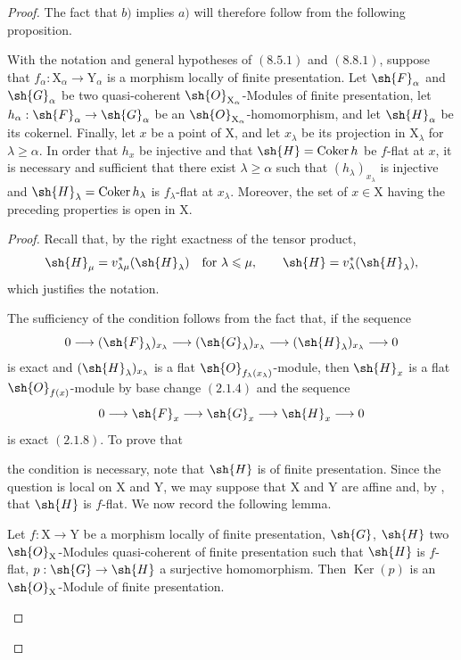 \begin{proof}
The fact that $b)$ implies $a)$ will therefore follow from the following proposition.

\begin{proposition}[11.3.9]
\label{IV.11.3.9}
With the notation and general hypotheses of $(8.5.1)$ and $(8.8.1)$, suppose that $f_\alpha:\mathrm{X}_\alpha\to\mathrm{Y}_\alpha$ is a morphism locally of finite presentation. Let $\sh{F}_\alpha$ and $\sh{G}_\alpha$ be two quasi-coherent $\sh{O}_{\mathrm{X}_\alpha}$-Modules of finite presentation, let $h_\alpha:\sh{F}_\alpha\to\sh{G}_\alpha$ be an $\sh{O}_{\mathrm{X}_\alpha}$-homomorphism, and let $\sh{H}_\alpha$ be its cokernel. Finally, let $x$ be a point of $\mathrm{X}$, and let $x_\lambda$ be its projection in $\mathrm{X}_\lambda$ for $\lambda\geqslant\alpha$. In order that $h_x$ be injective and that $\sh{H}=\operatorname{Coker}h$ be $f$-flat at $x$, it is necessary and sufficient that there exist $\lambda\geqslant\alpha$ such that $(h_\lambda)_{x_\lambda}$ is injective and $\sh{H}_\lambda=\operatorname{Coker}h_\lambda$ is $f_\lambda$-flat at $x_\lambda$. Moreover, the set of $x\in\mathrm{X}$ having the preceding properties is open in $\mathrm{X}$.
\end{proposition}

\begin{proof}
Recall that, by the right exactness of the tensor product,
\[
  \sh{H}_\mu=v^*_{\lambda\mu}(\sh{H}_\lambda)
  \quad\text{for }\lambda\leqslant\mu,
  \qquad
  \sh{H}=v^*_\lambda(\sh{H}_\lambda),
\]
which justifies the notation.

The sufficiency of the condition follows from the fact that, if the sequence
\[
  0\longrightarrow(\sh{F}_\lambda)_{x_\lambda}
  \longrightarrow(\sh{G}_\lambda)_{x_\lambda}
  \longrightarrow(\sh{H}_\lambda)_{x_\lambda}
  \longrightarrow0
\]
is exact and $(\sh{H}_\lambda)_{x_\lambda}$ is a flat $\sh{O}_{f_\lambda(x_\lambda)}$-module, then $\sh{H}_x$ is a flat $\sh{O}_{f(x)}$-module by base change $(2.1.4)$ and the sequence
\[
  0\longrightarrow\sh{F}_x
  \longrightarrow\sh{G}_x
  \longrightarrow\sh{H}_x
  \longrightarrow0
\]
is exact $(2.1.8)$. To prove that


the condition is necessary, note that $\sh{H}$ is of finite presentation. Since the question is local on $\mathrm{X}$ and $\mathrm{Y}$, we may suppose that $\mathrm{X}$ and $\mathrm{Y}$ are affine and, by , that $\sh{H}$ is $f$-flat. We now record the following lemma.

\begin{lemma}[11.3.9.1]
\label{IV.11.3.9.1}
Let $f:\mathrm{X}\to\mathrm{Y}$ be a morphism locally of finite presentation, $\sh{G}$, $\sh{H}$ two $\sh{O}_\mathrm{X}$-Modules quasi-coherent of finite presentation such that $\sh{H}$ is $f$-flat, $p:\sh{G}\to\sh{H}$ a surjective homomorphism. Then $\operatorname{Ker}(p)$ is an $\sh{O}_\mathrm{X}$-Module of finite presentation.
\end{lemma}


\end{proof}
\end{proof}
